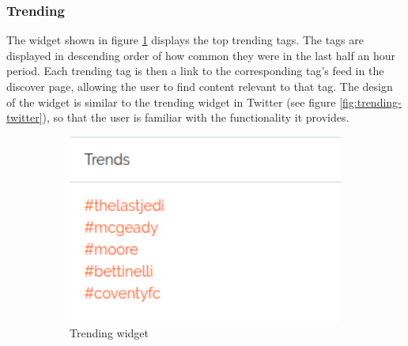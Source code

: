 \subsubsection{Trending} \label{sec:design-trending}
The widget shown in figure \ref{fig:trending} displays the top trending tags. The tags are displayed in descending order of how common they were in the last half an hour period. Each trending tag is then a link to the corresponding tag's feed in the discover page, allowing the user to find content relevant to that tag. The design of the widget is similar to the trending widget in Twitter (see figure \ref{fig:trending-twitter}), so that the user is familiar with the functionality it provides.

\begin{figure}[H]
	\centering
	\begin{subfigure}[b]{0.4\linewidth}
		\includegraphics[width=1\textwidth]{Images/Design/trending-widget}
		\caption{Trending widget}
		\label{fig:trending}
	\end{subfigure}
	\begin{subfigure}[b]{0.4\linewidth}

\end{subfigure}
\end{figure}
